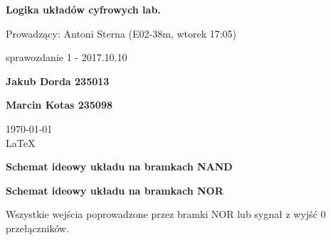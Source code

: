\documentclass[12pt,a4paper]{report}
\begin{document}
	
	\begin{titlepage}
		
		\centering
		{\huge\bfseries Logika układów cyfrowych lab.\par}
		
		\vspace{0.5cm}
		Prowadzący: Antoni Sterna (E02-38m, wtorek 17:05) \\
	
		\vspace{1.1cm}
		{\Large sprawozdanie 1 - 2017.10.10\par}
		\vfill
		
		{\large\bfseries Jakub Dorda 235013\par}
		{\large\bfseries Marcin Kotas 235098\par}
		
		\vspace{1cm}
		\today \\ \LaTeX
		
		\restoregeometry
	\end{titlepage}
	
	
	
	
	
	
	
	
	
	{\large\bfseries Schemat ideowy układu na bramkach NAND}
	\vspace{0.5cm}
	\begin{center}
	\end{center}
	
	{\large\bfseries Schemat ideowy układu na bramkach NOR}
	\vspace{0.5cm}
	\begin{center}
	\end{center}
	Wszystkie wejścia poprowadzone przez bramki NOR lub sygnał z wyjść 0 przełączników. 
	
	
	
	
\end{document}
